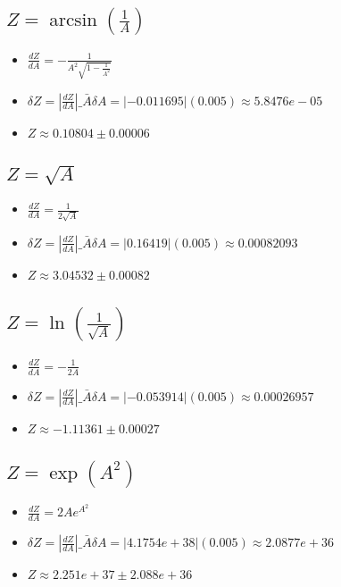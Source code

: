 \documentclass[12pt]{exam}
\begin{document}
\subsection{$Z = \arcsin(\frac{1}{A})$}
\begin{itemize}
\item $\frac{dZ}{dA} = - \frac{1}{A^{2} \sqrt{1 - \frac{1}{A^{2}}}}$
\item $\delta Z = \left|\frac{dZ}{dA}\right|\_{\bar{A}} \delta A = |-0.011695|(0.005) \approx 5.8476e-05$
\item $Z \approx 0.10804 \pm 0.00006$
\end{itemize}
\vspace{0.5cm}

\subsection{$Z = \sqrt{A}$}
\begin{itemize}
\item $\frac{dZ}{dA} = \frac{1}{2 \sqrt{A}}$
\item $\delta Z = \left|\frac{dZ}{dA}\right|\_{\bar{A}} \delta A = |0.16419|(0.005) \approx 0.00082093$
\item $Z \approx 3.04532 \pm 0.00082$
\end{itemize}
\vspace{0.5cm}

\subsection{$Z = \ln(\frac{1}{\sqrt{A}})$}
\begin{itemize}
\item $\frac{dZ}{dA} = - \frac{1}{2 A}$
\item $\delta Z = \left|\frac{dZ}{dA}\right|\_{\bar{A}} \delta A = |-0.053914|(0.005) \approx 0.00026957$
\item $Z \approx -1.11361 \pm 0.00027$
\end{itemize}
\vspace{0.5cm}

\subsection{$Z = \exp(A^2)$}
\begin{itemize}
\item $\frac{dZ}{dA} = 2 A e^{A^{2}}$
\item $\delta Z = \left|\frac{dZ}{dA}\right|\_{\bar{A}} \delta A = |4.1754e+38|(0.005) \approx 2.0877e+36$
\item $Z \approx 2.251e+37 \pm 2.088e+36$
\end{itemize}
\vspace{0.5cm}
\end{document}
